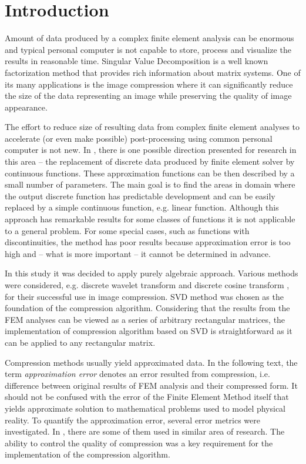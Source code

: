 \section{Introduction}
\label{sec:introduction}

Amount of data produced by a complex finite element analysis can be enormous and typical personal computer is not capable to store, process and visualize the results in reasonable time. Singular Value Decomposition is a well known factorization method that provides rich information about matrix systems. One of its many applications is the image compression where it can significantly reduce the size of the data representing an image while preserving the quality of image appearance.

The effort to reduce size of resulting data from complex finite element analyses to accelerate (or even make possible) post-processing using common personal computer is not new. In \cite{Benes2016}, there is one possible direction presented for research in this area -- the replacement of discrete data produced by finite element solver by continuous functions. These approximation functions can be then described by a small number of parameters. The main goal is to find the areas in domain where the output discrete function has predictable development and can be easily replaced by a simple continuous function, e.g. linear function. Although this approach has remarkable results for some classes of functions it is not applicable to a general problem. For some special cases, such as functions with discontinuities, the method has poor results because approximation error is too high and -- what is more important -- it cannot be determined in advance.

In this study it was decided to apply purely algebraic approach. Various methods were considered, e.g. discrete wavelet transform \cite{Lui2001} and discrete cosine transform \cite{Watson1994}, for their successful use in image compression. SVD method \cite{Baker2005, Kalman1996, Golub1996} was chosen as the foundation of the compression algorithm. Considering that the results from the FEM analyses can be viewed as a series of arbitrary rectangular matrices, the implementation of compression algorithm based on SVD is straightforward as it can be applied to any rectangular matrix.

Compression methods usually yield approximated data. In the following text, the term \textit{approximation error} denotes an error resulted from compression, i.e. difference between original results of FEM analysis and their compressed form. It should not be confused with the error of the Finite Element Method itself that yields approximate solution to mathematical problems used to model physical reality. To quantify the approximation error, several error metrics were investigated. In \cite{SairaBanu2015}, there are some of them used in similar area of research. The ability to control the quality of compression was a key requirement for the implementation of the compression algorithm.

